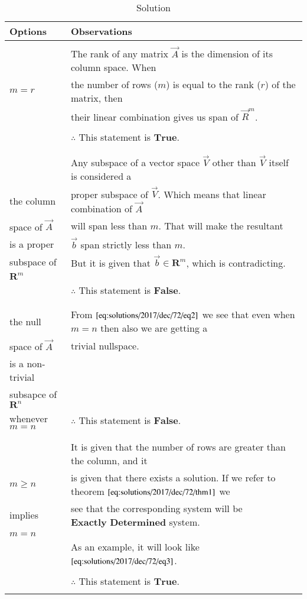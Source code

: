 	\begin{table*}[!ht]
		\begin{tabular}{|l|l|}
			\hline
			Options & Observations\\
			\hline
			& \\
			& The rank of any matrix $\vec{A}$ is the dimension of its column space. When  \\
			$m = r$&  the number of rows ($m$) is equal to the rank ($r$) of the matrix, then \\
			&  their linear combination gives us span of $\vec{R}^{m}$.\\
			& \\
			& $\therefore$ This statement is $\textbf{True}$. \\
			& \\
			\hline 
			& \\
			& Any subspace of a vector space $\vec{V}$ other than $\vec{V}$ itself is considered a \\
			the column & proper subspace of $\vec{V}$. Which means that linear combination of $\vec{A}$\\
			space of $\vec{A}$ & will span less than $m$. That will make the resultant\\
			is a proper & $\vec{b}$ span strictly less than $m$.\\ 
			subspace of & But it is given that $\vec{b} \in \mathbf{R}^{m}$, which is contradicting.\\  
			$\mathbf{R}^{m}$ & \\
			& $\therefore$ This statement is $\textbf{False}$. \\
			& \\
			\hline
			& \\
			the null & From $\eqref{eq:solutions/2017/dec/72/eq2}$ we see that even when $m = n$ then also we are getting a\\ 
			space of $\vec{A}$ & trivial nullspace. \\
			is a non-trivial& \\
			subsapce of $\mathbf{R}^{n}$& \\
			whenever $m=n$& $\therefore$ This statement is $\textbf{False}$. \\
			& \\
			\hline
			& \\
			& It is given that the number of rows are greater than the column, and it \\
			$m \geq n$ & is given that there exists a solution. If we refer to theorem $\eqref{eq:solutions/2017/dec/72/thm1}$ we \\
			implies & see that the corresponding system will be $\textbf{Exactly Determined}$ system. \\
			$m=n$ & \\
			& As an example, it will look like $\eqref{eq:solutions/2017/dec/72/eq3}$.\\
			& \\
			& $\therefore$ This statement is $\textbf{True}$. \\
			& \\
			\hline
		\end{tabular}
\caption{Solution}
\label{eq:solutions/2017/dec/72/table}
	\end{table*}
	
